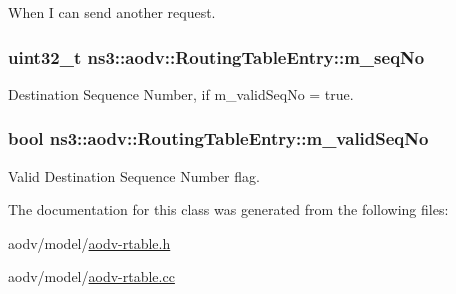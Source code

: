 When I can send another request. 

\subsubsection[{\texorpdfstring{m\+\_\+seq\+No}{m_seqNo}}]{\setlength{\rightskip}{0pt plus 5cm}uint32\+\_\+t ns3\+::aodv\+::\+Routing\+Table\+Entry\+::m\+\_\+seq\+No\hspace{0.3cm}{\ttfamily [private]}}\hypertarget{classns3_1_1aodv_1_1RoutingTableEntry_add3bc8ee00507187eeddbb42cfa096f8}{}\label{classns3_1_1aodv_1_1RoutingTableEntry_add3bc8ee00507187eeddbb42cfa096f8}


Destination Sequence Number, if m\+\_\+valid\+Seq\+No = true. 

\subsubsection[{\texorpdfstring{m\+\_\+valid\+Seq\+No}{m_validSeqNo}}]{\setlength{\rightskip}{0pt plus 5cm}bool ns3\+::aodv\+::\+Routing\+Table\+Entry\+::m\+\_\+valid\+Seq\+No\hspace{0.3cm}{\ttfamily [private]}}\hypertarget{classns3_1_1aodv_1_1RoutingTableEntry_a2541115c98ccaba8d4b0de6c19cf6c16}{}\label{classns3_1_1aodv_1_1RoutingTableEntry_a2541115c98ccaba8d4b0de6c19cf6c16}


Valid Destination Sequence Number flag. 



The documentation for this class was generated from the following files\+:\begin{DoxyCompactItemize}
\item 
aodv/model/\hyperlink{aodv-rtable_8h}{aodv-\/rtable.\+h}\item 
aodv/model/\hyperlink{aodv-rtable_8cc}{aodv-\/rtable.\+cc}\end{DoxyCompactItemize}
